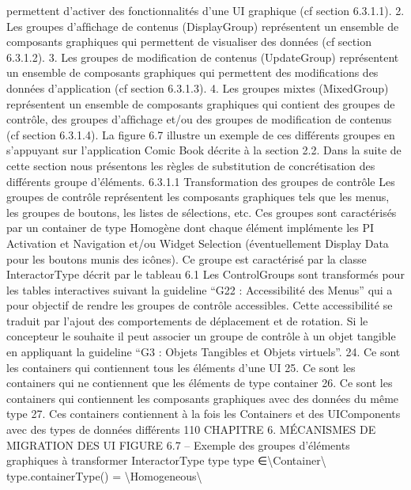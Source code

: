 \documentclass{article}
\begin{document}
permettent d’activer des fonctionnalit\'{e}s d’une UI graphique (cf section 6.3.1.1).
2. Les groupes d’afﬁchage de contenus (DisplayGroup) repr\'{e}sentent un ensemble de composants
graphiques qui permettent de visualiser des donn\'{e}es (cf section 6.3.1.2).
3. Les groupes de modiﬁcation de contenus (UpdateGroup) repr\'{e}sentent un ensemble de composants graphiques qui permettent des modiﬁcations des donn\'{e}es d’application (cf section
6.3.1.3).
4. Les groupes mixtes (MixedGroup) repr\'{e}sentent un ensemble de composants graphiques qui
contient des groupes de contr\^{o}le, des groupes d’afﬁchage et/ou des groupes de modiﬁcation de
contenus (cf section 6.3.1.4).
La ﬁgure 6.7 illustre un exemple de ces diff\'{e}rents groupes en s’appuyant sur l’application Comic
Book d\'{e}crite \`{a} la section 2.2. Dans la suite de cette section nous pr\'{e}sentons les r\`{e}gles de substitution
de concr\'{e}tisation des diff\'{e}rents groupe d’\'{e}l\'{e}ments.
6.3.1.1
Transformation des groupes de contr\^{o}le
Les groupes de contr\^{o}le repr\'{e}sentent les composants graphiques tels que les menus, les groupes de
boutons, les listes de s\'{e}lections, etc. Ces groupes sont caract\'{e}ris\'{e}s par un container de type Homog\`{e}ne
dont chaque \'{e}l\'{e}ment impl\'{e}mente les PI Activation et Navigation et/ou Widget Selection (\'{e}ventuellement Display Data pour les boutons munis des ic\^{o}nes).
Ce groupe est caract\'{e}ris\'{e} par la classe InteractorType d\'{e}crit par le tableau 6.1
Les ControlGroups sont transform\'{e}s pour les tables interactives suivant la guideline “G22 : Accessibilit\'{e} des Menus” qui a pour objectif de rendre les groupes de contr\^{o}le accessibles. Cette accessibilit\'{e} se traduit par l’ajout des comportements de d\'{e}placement et de rotation. Si le concepteur le
souhaite il peut associer un groupe de contr\^{o}le \`{a} un objet tangible en appliquant la guideline “G3 :
Objets Tangibles et Objets virtuels”.
24. Ce sont les containers qui contiennent tous les \'{e}l\'{e}ments d’une UI
25. Ce sont les containers qui ne contiennent que les \'{e}l\'{e}ments de type container
26. Ce sont les containers qui contiennent les composants graphiques avec des donn\'{e}es du m\^{e}me type
27. Ces containers contiennent \`{a} la fois les Containers et des UIComponents avec des types de donn\'{e}es diff\'{e}rents
110
CHAPITRE 6. MÉCANISMES DE MIGRATION DES UI
FIGURE 6.7 – Exemple des groupes d’\'{e}l\'{e}ments graphiques \`{a} transformer
InteractorType
type
type ∈\textbackslash{}{Container\textbackslash{}}
type.containerType() = \textbackslash{}{Homogeneous\textbackslash{}}
\end{document}

